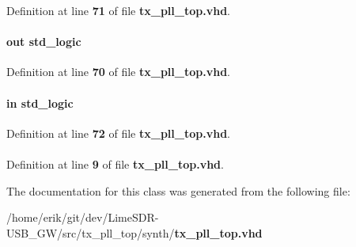 Definition at line {\bf 71} of file {\bf tx\+\_\+pll\+\_\+top.\+vhd}.

\paragraph[{smpl\+\_\+cmp\+\_\+en}]{ {\bfseries \textcolor{keywordflow}{out}\textcolor{vhdlchar}{ }} {\bfseries \textcolor{comment}{std\+\_\+logic}\textcolor{vhdlchar}{ }} \hspace{0.3cm}{\ttfamily [Port]}}\label{classtx__pll__top_abde511db8e14b8bf12a4d291e0991cb1}


Definition at line {\bf 70} of file {\bf tx\+\_\+pll\+\_\+top.\+vhd}.

\paragraph[{smpl\+\_\+cmp\+\_\+error}]{ {\bfseries \textcolor{keywordflow}{in}\textcolor{vhdlchar}{ }} {\bfseries \textcolor{comment}{std\+\_\+logic}\textcolor{vhdlchar}{ }} \hspace{0.3cm}{\ttfamily [Port]}}\label{classtx__pll__top_ab89caaf9e342c725af6f87ac27d615ef}


Definition at line {\bf 72} of file {\bf tx\+\_\+pll\+\_\+top.\+vhd}.

\paragraph[{std\+\_\+logic\+\_\+1164}]{\hspace{0.3cm}{\ttfamily [Package]}}\label{classtx__pll__top_acd03516902501cd1c7296a98e22c6fcb}


Definition at line {\bf 9} of file {\bf tx\+\_\+pll\+\_\+top.\+vhd}.



The documentation for this class was generated from the following file\+:\begin{DoxyCompactItemize}
\item 
/home/erik/git/dev/\+Lime\+S\+D\+R-\/\+U\+S\+B\+\_\+\+G\+W/src/tx\+\_\+pll\+\_\+top/synth/{\bf tx\+\_\+pll\+\_\+top.\+vhd}\end{DoxyCompactItemize}
